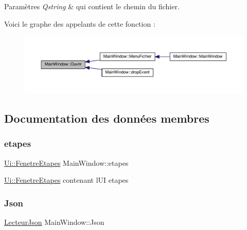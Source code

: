 \begin{DoxyParams}{Paramètres}
{\em Qstring} & qui contient le chemin du fichier. \\
\hline
\end{DoxyParams}
Voici le graphe des appelants de cette fonction \+:
\nopagebreak
\begin{figure}[H]
\begin{center}
\leavevmode
\includegraphics[width=350pt]{class_main_window_a37a30280ba05a52445ecbea9deaa5385_icgraph}
\end{center}
\end{figure}


\subsection{Documentation des données membres}
\mbox{\label{class_main_window_aee806e7be315f0cc67e8e7cd19f7d651}} 
\subsubsection{\texorpdfstring{etapes}{etapes}}
{\footnotesize\ttfamily \hyperlink{class_ui_1_1_fenetre_etapes}{Ui\+::\+Fenetre\+Etapes} Main\+Window\+::etapes\hspace{0.3cm}{\ttfamily [private]}}

\hyperlink{class_ui_1_1_fenetre_etapes}{Ui\+::\+Fenetre\+Etapes} contenant l\textquotesingle{}UI etapes \mbox{\label{class_main_window_a9db0843494679d79521b63ca3b6f3f7e}} 
\subsubsection{\texorpdfstring{Json}{Json}}
{\footnotesize\ttfamily \hyperlink{class_lecteur_json}{Lecteur\+Json} Main\+Window\+::\+Json\hspace{0.3cm}{\ttfamily [private]}}

